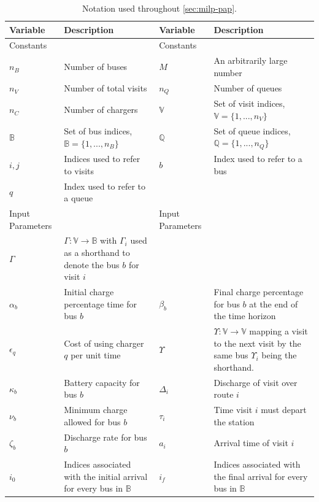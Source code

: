 \documentclass[ee,thesis]{usuthesis}
\begin{document}
\begin{table}[htbp]
\caption{\label{tab:variables}Notation used throughout \ref{sec:milp-pap}.}
\centering
\begin{tabularx}{\textwidth}{L{0.3} L{1.2} L{0.3} L{1.2}}
\textbf{Variable} & \textbf{Description} & \textbf{Variable} & \textbf{Description}\\[0pt]
\hline
Constants &  & Constants & \\[0pt]
\(n_B\) & Number of buses & \(M\) & An arbitrarily large number\\[0pt]
\(n_V\) & Number of total visits & \(n_Q\) & Number of queues\\[0pt]
\(n_C\) & Number of chargers & \(\mathbb{V}\) & Set of visit indices, \(\mathbb{V} = \{1, ..., n_V\}\)\\[0pt]
\(\mathbb{B}\) & Set of bus indices, \(\mathbb{B} = \{1, ..., n_B\}\) & \(\mathbb{Q}\) & Set of queue indices, \(\mathbb{Q} = \{1, ..., n_Q\}\)\\[0pt]
\(i,j\) & Indices used to refer to visits & \(b\) & Index used to refer to a bus\\[0pt]
\(q\) & Index used to refer to a queue &  & \\[0pt]
\hline
Input Parameters &  & Input Parameters & \\[0pt]
\(\Gamma\) & \(\Gamma: \mathbb{V} \rightarrow \mathbb{B}\) with \(\Gamma_i\) used as a shorthand to denote the bus \(b\) for visit \(i\) &  & \\[0pt]
\(\alpha_b\) & Initial charge percentage time for bus \(b\) & \(\beta_b\) & Final charge percentage for bus \(b\) at the end of the time horizon\\[0pt]
\(\epsilon_q\) & Cost of using charger \(q\) per unit time & \(\Upsilon\) & \(\Upsilon: \mathbb{V} \rightarrow \mathbb{V}\) mapping a visit to the next visit by the same bus \(\Upsilon_i\) being the shorthand.\\[0pt]
\(\kappa_b\) & Battery capacity for bus \(b\) & \(\Delta_i\) & Discharge of visit over route \(i\)\\[0pt]
\(\nu_b\) & Minimum charge allowed for bus \(b\) & \(\tau_i\) & Time visit \(i\) must depart the station\\[0pt]
\(\zeta_b\) & Discharge rate for bus \(b\) & \(a_i\) & Arrival time of visit \(i\)\\[0pt]
\(i_0\) & Indices associated with the initial arrival for every bus in \(\mathbb{B}\) & \(i_f\) & Indices associated with the final arrival for every bus in \(\mathbb{B}\)\\[0pt]

\end{tabularx}
\end{table}
\end{document}
